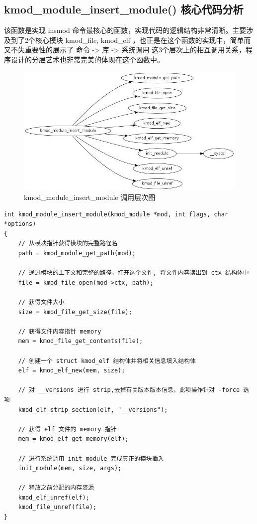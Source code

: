 \subsection{kmod\_module\_insert\_module() 核心代码分析}

该函数是实现 insmod
命令最核心的函数，实现代码的逻辑结构非常清晰。主要涉及到了2个核心模块
kmod\_file, kmod\_elf
，也正是在这个函数的实现中，简单而又不失重要性的展示了 命令
-\textgreater{} 库 -\textgreater{} 系统调用
这3个层次上的相互调用关系，程序设计的分层艺术也非常完美的体现在这个函数中。

\begin{figure}[htbp]
\centering
\includegraphics{./figures/kmod_module_insert_module.jpg}
\caption{kmod\_module\_insert\_module 调用层次图}
\end{figure}

{\begin{shaded}\begin{verbatim}
int kmod_module_insert_module(kmod_module *mod, int flags, char *options)
{
    // 从模块指针获得模块的完整路径名
    path = kmod_module_get_path(mod);

    // 通过模块的上下文和完整的路径，打开这个文件, 将文件内容读出到 ctx 结构体中
    file = kmod_file_open(mod->ctx, path);

    // 获得文件大小
    size = kmod_file_get_size(file);

    // 获得文件内容指针 memory
    mem = kmod_file_get_contents(file);

    // 创建一个 struct kmod_elf 结构体并将相关信息填入结构体
    elf = kmod_elf_new(mem, size);

    // 对 __versions 进行 strip,去掉有关版本版本信息，此项操作针对 -force 选项
    kmod_elf_strip_section(elf, "__versions");

    // 获得 elf 文件的 memory 指针
    mem = kmod_elf_get_memory(elf);

    // 进行系统调用 init_module 完成真正的模块插入
    init_module(mem, size, args);

    // 释放之前分配的内存资源
    kmod_elf_unref(elf);
    kmod_file_unref(file);
}
\end{verbatim}\end{shaded}}
